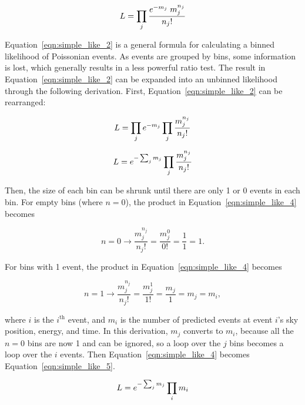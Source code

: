   \begin{equation}\label{eqn:simple_like_2}
    L = \prod_j \frac{ e^{-m_j} \; m_{j}^{n_j}}{n_{j}!}
  \end{equation}
  
  Equation~\ref{eqn:simple_like_2} is a general formula for calculating a binned likelihood of Poissonian events.
  As events are grouped by bins, some information is lost, which generally results in a less powerful ratio test.
  The result in Equation~\ref{eqn:simple_like_2} can be expanded into an unbinned likelihood through the following derivation.
  First, Equation~\ref{eqn:simple_like_2} can be rearranged:
  
  \begin{equation}\label{eqn:simple_like_3}
    L = \prod_j e^{-m_j} \prod_j \frac{m_j^{n_j}}{n_{j}!}
  \end{equation}
    
  \begin{equation}\label{eqn:simple_like_4}
    L = e^{- \sum_j m_j} \prod_j \frac{m_j^{n_j}}{n_{j}!}
  \end{equation}
  
  Then, the size of each bin can be shrunk until there are only 1 or 0 events in each bin.
  For empty bins (where $n=0$), the product in Equation~\ref{eqn:simple_like_4} becomes
  
  \begin{equation}\label{eqn:simple_like_4a}
    n=0 \rightarrow \frac{m_j^{n_j}}{n_j!} = \frac{m_j^{0}}{0!} = \frac{1}{1} = 1 .
  \end{equation}

  For bins with 1 event, the product in Equation~\ref{eqn:simple_like_4} becomes

  \begin{equation}\label{eqn:simple_like_4b}
    n=1 \rightarrow \frac{m_j^{n_j}}{n_j!} = \frac{m_j^1}{1!} = \frac{m_j}{1} = m_j = m_i ,
  \end{equation}

  where $i$ is the $i^{\textrm{th}}$ event, and $m_i$ is the number of predicted events at event $i$'s sky position, energy, and time.
  In this derivation, $m_j$ converts to $m_i$, because all the $n=0$ bins are now 1 and can be ignored, so a loop over the $j$ bins becomes a loop over the $i$ events.
  Then Equation~\ref{eqn:simple_like_4} becomes Equation~\ref{eqn:simple_like_5}.
  
  \begin{equation}\label{eqn:simple_like_5}
    L = e^{- \sum_j m_j} \prod_i m_i
  \end{equation}
  
